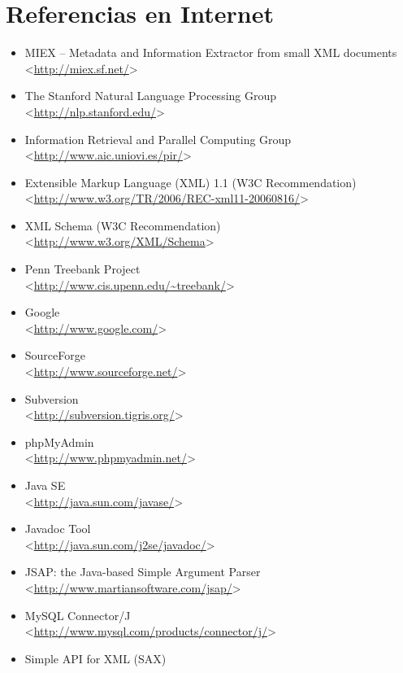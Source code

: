 \chapter{Referencias en Internet}\label{cha:referencias}

\begin{itemize}
 \item MIEX -- Metadata and Information Extractor from small XML documents\\
 <\url{http://miex.sf.net/}>
 \item The Stanford Natural Language Processing Group\\
 <\url{http://nlp.stanford.edu/}>
 \item Information Retrieval and Parallel Computing Group\\
 <\url{http://www.aic.uniovi.es/pir/}>
 \item Extensible Markup Language (XML) 1.1 (W3C Recommendation)\\
 <\url{http://www.w3.org/TR/2006/REC-xml11-20060816/}>
 \item XML Schema (W3C Recommendation)\\
 <\url{http://www.w3.org/XML/Schema}>
 \item Penn Treebank Project\\
 <\url{http://www.cis.upenn.edu/~treebank/}>
 \item Google\\
 <\url{http://www.google.com/}>
 \item SourceForge\\
 <\url{http://www.sourceforge.net/}>
 \item Subversion\\
 <\url{http://subversion.tigris.org/}>
 \item phpMyAdmin\\
 <\url{http://www.phpmyadmin.net/}>
 \item Java SE\\
 <\url{http://java.sun.com/javase/}>
 \item Javadoc Tool\\
 <\url{http://java.sun.com/j2se/javadoc/}>
 \item JSAP: the Java-based Simple Argument Parser\\
 <\url{http://www.martiansoftware.com/jsap/}>
 \item MySQL Connector/J\\
 <\url{http://www.mysql.com/products/connector/j/}>
 \item Simple API for XML (SAX)\\

\end{itemize}
